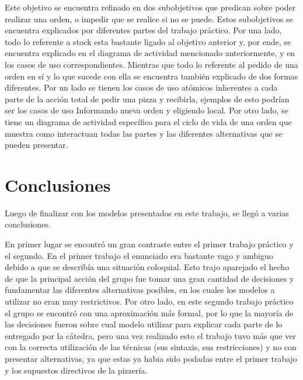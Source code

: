 \documentclass[a4paper,10pt]{article}
\begin{document}
Este objetivo se encuentra refinado en dos subobjetivos que predican sobre poder realizar una orden, o impedir que se realice si no se puede.
Estos subobjetivos se encuentra explicados por diferentes partes del trabajo pr\'actico. Por una lado, todo lo referente a stock esta bastante
ligado al objetivo anterior y, por ende, se encuentra explicado en el diagrama de actividad mencionado anteriormente, y en los casos de uso correspondientes.
Mientras que todo lo referente al pedido de una orden en s\'i y lo que sucede con ella se encuentra tambi\'en explicado de dos formas diferentes.
Por un lado se tienen los casos de uso at\'omicos inherentes a cada parte de la acci\'on total de pedir una pizza y recibirla, ejemplos de esto
podr\'ian ser los casos de uso Informando nueva orden y eligiendo local. Por otro lado, se tiene un diagrama de actividad espec\'ifico para el
ciclo de vida de una orden que muestra como interactuan todas las partes y las diferentes alternativas que se pueden presentar.


\newpage
\section*{Conclusiones}


Luego de finalizar con los modelos presentados en este trabajo, se lleg\'o a varias conclusiones.

En primer lugar se encontr\'o un gran contraste entre el primer trabajo pr\'actico y el segundo.
En el primer trabajo el enunciado era bastante vago y ambiguo debido a que se describ\'ia una situaci\'on coloquial. Esto
trajo aparejado el hecho de que la principal acci\'on del grupo fue tomar una gran cantidad de decisiones y fundamentar las diferentes
alternativas posibles, en los cuales los modelos a utilizar no eran muy restrictivos. Por otro lado, en este segundo trabajo pr\'actico el grupo se encontr\'o
con una aproximaci\'on m\'as formal, por lo que la mayor\'ia de las decisiones fueron sobre cual modelo utilizar para explicar cada parte de lo
entregado por la c\'atedra, pero una vez realizado esto el trabajo tuvo m\'as que ver con la correcta utilizaci\'on de las t\'ecnicas (sus sintaxis, sus restricciones)
y no con presentar alternativas, ya que estas ya habia sido podadas entre el primer trabajo y los supuestos directivos de la pizzer\'ia.
\end{document}

